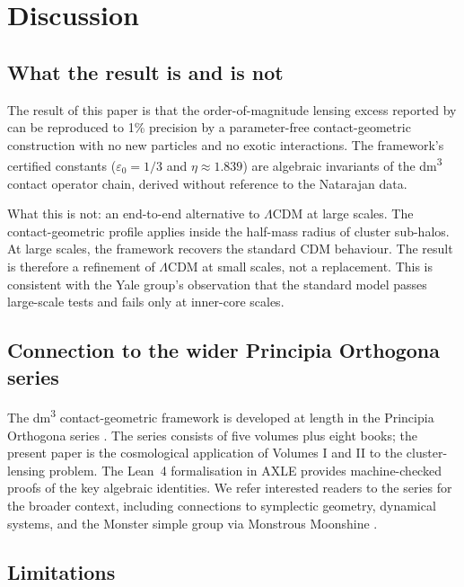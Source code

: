 \documentclass[11pt,a4paper]{article}
\theoremstyle{definition}
\theoremstyle{remark}
\begin{document}
\section{Discussion}
\label{sec:discussion}

\subsection{What the result is and is not}

The result of this paper is that the order-of-magnitude lensing excess reported by \citet{NatarajanChiangDutra2026} can be reproduced to 1\% precision by a parameter-free contact-geometric construction with no new particles and no exotic interactions. The framework's certified constants ($\varepsilon_0 = 1/3$ and $\eta \approx 1.839$) are algebraic invariants of the dm\textsuperscript{3} contact operator chain, derived without reference to the Natarajan data.

What this is not: an end-to-end alternative to $\Lambda$CDM at large scales. The contact-geometric profile applies inside the half-mass radius of cluster sub-halos. At large scales, the framework recovers the standard CDM behaviour. The result is therefore a refinement of $\Lambda$CDM at small scales, not a replacement. This is consistent with the Yale group's observation that the standard model passes large-scale tests and fails only at inner-core scales.

\subsection{Connection to the wider Principia Orthogona series}

The dm\textsuperscript{3} contact-geometric framework is developed at length in the Principia Orthogona series \citep{principia2026}. The series consists of five volumes plus eight books; the present paper is the cosmological application of Volumes I and II to the cluster-lensing problem. The Lean~4 formalisation in AXLE \citep{AXLE2026} provides machine-checked proofs of the key algebraic identities. We refer interested readers to the series for the broader context, including connections to symplectic geometry, dynamical systems, and the Monster simple group via Monstrous Moonshine \citep{Borcherds1992}.

\subsection{Limitations}
\end{document}

